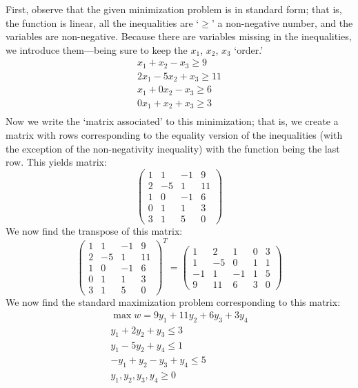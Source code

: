 \documentclass[12pt,letterpaper]{exam}
\begin{document}
\begin{questions}
\sol First, observe that the given minimization problem is in standard form; that is, the function is linear, all the inequalities are `$\geq$' a non-negative number, and the variables are non-negative. Because there are variables missing in the inequalities, we introduce them---being sure to keep the $x_1$, $x_2$, $x_3$ `order.' 
	\[
	\begin{gathered}
	x_1 + x_2 - x_3 \geq 9 \\
	2x_1 - 5x_2 + x_3 \geq 11 \\
	x_1 + 0x_2 - x_3 \geq 6 \\
	0x_1 + x_2 + x_3 \geq 3 \\
	\end{gathered}
	\] 
Now we write the `matrix associated' to this minimization; that is, we create a matrix with rows corresponding to the equality version of the inequalities (with the exception of the non-negativity inequality) with the function being the last row. This yields matrix:
	\[
	\begin{pmatrix}
	1 & 1 & -1 & 9 \\
	2 & -5 & 1 & 11 \\
	1 & 0 & -1 & 6 \\
	0 & 1 & 1 & 3 \\
	3 & 1 & 5 & 0 
	\end{pmatrix}
	\]
We now find the transpose of this matrix: 
	\[
	\begin{pmatrix}
	1 & 1 & -1 & 9 \\
	2 & -5 & 1 & 11 \\
	1 & 0 & -1 & 6 \\
	0 & 1 & 1 & 3 \\
	3 & 1 & 5 & 0 
	\end{pmatrix}^T= 
	\begin{pmatrix}
	1 & 2 & 1 & 0 & 3 \\
	1 & -5 & 0 & 1 & 1 \\
	-1 & 1 & -1 & 1 & 5 \\
	9 & 11 & 6 & 3 & 0 
	\end{pmatrix}
	\]
We now find the standard maximization problem corresponding to this matrix:
	\[
	\begin{gathered}
	\max w= 9y_1 + 11y_2 + 6y_3 + 3y_4 \\
	y_1 + 2y_2 + y_3 \leq 3 \\
	y_1 - 5y_2 + y_4 \leq 1 \\
	-y_1 + y_2 - y_3 + y_4 \leq 5 \\
	y_1, y_2, y_3, y_4 \geq 0 
	\end{gathered}
	\] 


\end{questions}
\end{document}
